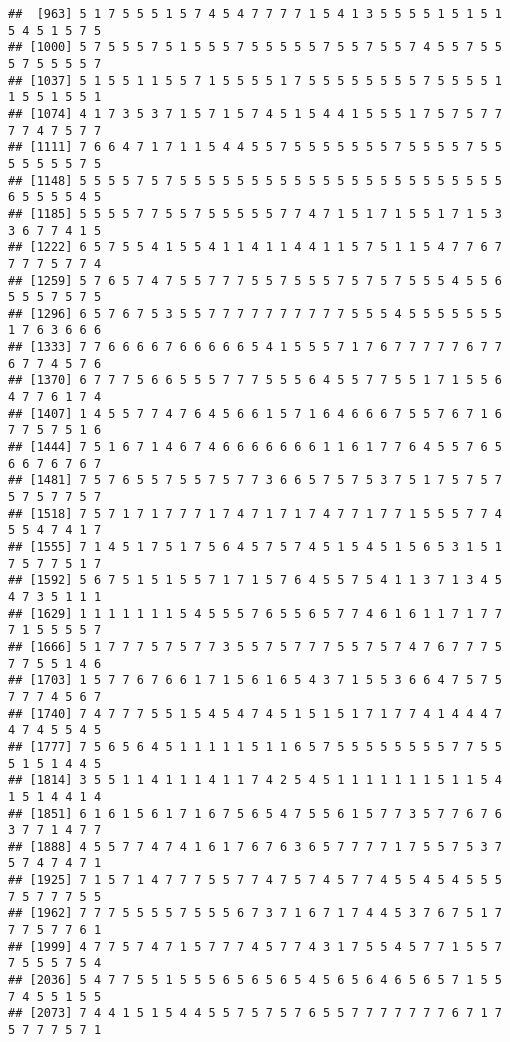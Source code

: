 \documentclass[
]{article}
\begin{document}
\begin{verbatim}
##  [963] 5 1 7 5 5 5 1 5 7 4 5 4 7 7 7 7 1 5 4 1 3 5 5 5 5 1 5 1 5 1 5 4 5 1 5 7 5
## [1000] 5 7 5 5 5 7 5 1 5 5 5 7 5 5 5 5 5 7 5 5 7 5 5 7 4 5 5 7 5 5 5 7 5 5 5 5 7
## [1037] 5 1 5 5 1 1 5 5 7 1 5 5 5 5 1 7 5 5 5 5 5 5 5 5 7 5 5 5 5 1 1 5 5 1 5 5 1
## [1074] 4 1 7 3 5 3 7 1 5 7 1 5 7 4 5 1 5 4 4 1 5 5 5 1 7 5 7 5 7 7 7 7 4 7 5 7 7
## [1111] 7 6 6 4 7 1 7 1 1 5 4 4 5 5 7 5 5 5 5 5 5 5 7 5 5 5 5 7 5 5 5 5 5 5 5 7 5
## [1148] 5 5 5 5 7 5 7 5 5 5 5 5 5 5 5 5 5 5 5 5 5 5 5 5 5 5 5 5 5 5 6 5 5 5 5 4 5
## [1185] 5 5 5 5 7 7 5 5 7 5 5 5 5 5 7 7 4 7 1 5 1 7 1 5 5 1 7 1 5 3 3 6 7 7 4 1 5
## [1222] 6 5 7 5 5 4 1 5 5 4 1 1 4 1 1 4 4 1 1 5 7 5 1 1 5 4 7 7 6 7 7 7 7 5 7 7 4
## [1259] 5 7 6 5 7 4 7 5 5 7 7 7 5 5 7 5 5 5 7 5 7 5 7 5 5 5 4 5 5 6 5 5 5 7 5 7 5
## [1296] 6 5 7 6 7 5 3 5 5 7 7 7 7 7 7 7 7 7 7 5 5 5 4 5 5 5 5 5 5 5 1 7 6 3 6 6 6
## [1333] 7 7 6 6 6 6 7 6 6 6 6 6 5 4 1 5 5 5 7 1 7 6 7 7 7 7 7 6 7 7 6 7 7 4 5 7 6
## [1370] 6 7 7 7 5 6 6 5 5 5 7 7 7 5 5 5 6 4 5 5 7 7 5 5 1 7 1 5 5 6 4 7 7 6 1 7 4
## [1407] 1 4 5 5 7 7 4 7 6 4 5 6 6 1 5 7 1 6 4 6 6 6 7 5 5 7 6 7 1 6 7 7 5 7 5 1 6
## [1444] 7 5 1 6 7 1 4 6 7 4 6 6 6 6 6 6 6 1 1 6 1 7 7 6 4 5 5 7 6 5 6 6 7 6 7 6 7
## [1481] 7 5 7 6 5 5 7 5 5 7 5 7 7 3 6 6 5 7 5 7 5 3 7 5 1 7 5 7 5 7 5 7 5 7 7 5 7
## [1518] 7 5 7 1 7 1 7 7 7 1 7 4 7 1 7 1 7 4 7 7 1 7 7 1 5 5 5 7 7 4 5 5 4 7 4 1 7
## [1555] 7 1 4 5 1 7 5 1 7 5 6 4 5 7 5 7 4 5 1 5 4 5 1 5 6 5 3 1 5 1 7 5 7 7 5 1 7
## [1592] 5 6 7 5 1 5 1 5 5 7 1 7 1 5 7 6 4 5 5 7 5 4 1 1 3 7 1 3 4 5 4 7 3 5 1 1 1
## [1629] 1 1 1 1 1 1 1 5 4 5 5 5 7 6 5 5 6 5 7 7 4 6 1 6 1 1 7 1 7 7 7 1 5 5 5 5 7
## [1666] 5 1 7 7 7 5 7 5 7 7 3 5 5 7 5 7 7 7 5 5 7 5 7 4 7 6 7 7 7 5 7 7 5 5 1 4 6
## [1703] 1 5 7 7 6 7 6 6 1 7 1 5 6 1 6 5 4 3 7 1 5 5 3 6 6 4 7 5 7 5 7 7 7 4 5 6 7
## [1740] 7 4 7 7 7 5 5 1 5 4 5 4 7 4 5 1 5 1 5 1 7 1 7 7 4 1 4 4 4 7 4 7 4 5 5 4 5
## [1777] 7 5 6 5 6 4 5 1 1 1 1 1 5 1 1 6 5 7 5 5 5 5 5 5 5 5 7 7 5 5 5 1 5 1 4 4 5
## [1814] 3 5 5 1 1 4 1 1 1 4 1 1 7 4 2 5 4 5 1 1 1 1 1 1 1 5 1 1 5 4 1 5 1 4 4 1 4
## [1851] 6 1 6 1 5 6 1 7 1 6 7 5 6 5 4 7 5 5 6 1 5 7 7 3 5 7 7 6 7 6 3 7 7 1 4 7 7
## [1888] 4 5 5 7 7 4 7 4 1 6 1 7 6 7 6 3 6 5 7 7 7 7 1 7 5 5 7 5 3 7 5 7 4 7 4 7 1
## [1925] 7 1 5 7 1 4 7 7 7 5 5 7 7 4 7 5 7 4 5 7 7 4 5 5 4 5 4 5 5 5 7 5 7 7 7 5 5
## [1962] 7 7 7 5 5 5 5 7 5 5 5 6 7 3 7 1 6 7 1 7 4 4 5 3 7 6 7 5 1 7 7 7 5 7 7 6 1
## [1999] 4 7 7 5 7 4 7 1 5 7 7 7 4 5 7 7 4 3 1 7 5 5 4 5 7 7 1 5 5 7 7 5 5 5 7 5 4
## [2036] 5 4 7 7 5 5 1 5 5 5 6 5 6 5 6 5 4 5 6 5 6 4 6 5 6 5 7 1 5 5 7 4 5 5 1 5 5
## [2073] 7 4 4 1 5 1 5 4 4 5 5 7 5 7 5 7 6 5 5 7 7 7 7 7 7 7 6 7 1 7 5 7 7 7 5 7 1

\end{verbatim}
\end{document}
